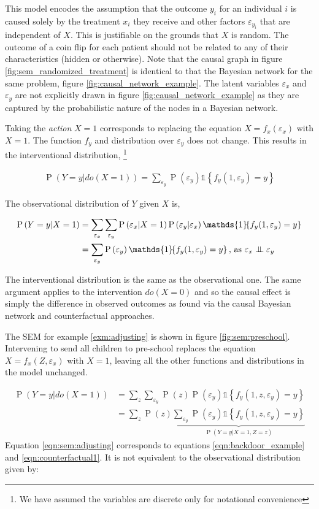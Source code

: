 \documentclass[11pt,a4paper,oneside]{book}
\newcommand{\set}[1]{\left\{#1\right\}}
\newcommand{\ind}[1]{\mathds{1}\!\!\set{#1}}
\newcommand{\eqn}[1]{\begin{align}#1\end{align}}
\renewcommand{\P}[1]{\operatorname{P}\left(#1\right)}
\theoremstyle{plain}
\theoremstyle{definition}
\let\epsilon\varepsilon
\newcommand{\ci}{\mathrel{\perp\mspace{-10mu}\perp}}
\begin{document}
This model encodes the assumption that the outcome $y_{i}$ for an individual $i$ is caused solely by the treatment $x_{i}$ they receive and other factors $\epsilon_{y_{i}}$ that are independent of $X$. This is justifiable on the grounds that $X$ is random. The outcome of a coin flip for each patient should not be related to any of their characteristics (hidden or otherwise). Note that the causal graph in figure \ref{fig:sem_randomized_treatment} is identical to that the Bayesian network for the same problem, figure \ref{fig:causal_network_example}. The latent variables $\epsilon_x$ and $\epsilon_y$ are not explicitly drawn in figure \ref{fig:causal_network_example} as they are captured by the probabilistic nature of the nodes in a Bayesian network.

Taking the \emph{action} $X=1$ corresponds to replacing the equation $X=f_x(\epsilon_x)$ with $X=1$. The function $f_y$ and distribution over $\epsilon_y$ does not change. This results in the interventional distribution, \footnote{We have assumed the variables are discrete only for notational convenience}

\eqn {
\P{Y=y|do(X=1)} = \sum_{\epsilon_y}\P{\epsilon_y}\ind{f_y(1,\epsilon_y)=y}
}

The observational distribution of $Y$ given $X$ is,

\eqn{
\P{Y=y|X=1} &= \sum_{\epsilon_x}\sum_{\epsilon_y}\P{\epsilon_x|X=1}\P{\epsilon_y|\epsilon_x}\ind{f_y(1,\epsilon_y)=y} \\
& = \sum_{\epsilon_y}\P{\epsilon_y}\ind{f_y(1,\epsilon_y)=y} \text{, as } \epsilon_x \ci \epsilon_y
}

The interventional distribution is the same as the observational one. The same argument applies to the intervention $do(X=0)$ and so the causal effect is simply the difference in observed outcomes as found via the causal Bayesian network and counterfactual approaches. 

The SEM for example \ref{exm:adjusting} is shown in figure \ref{fig:sem:preschool}. Intervening to send all children to pre-school replaces the equation $X = f_x(Z,\epsilon_x)$ with $X=1$, leaving all the other functions and distributions in the model unchanged. 

\eqn{
\P{Y=y|do(X=1)} &= \sum_{z}\sum_{\epsilon_y}\P{z}\P{\epsilon_y}\ind{f_y(1,z,\epsilon_y)=y} \\
\label{eqn:sem:adjusting}
&=\sum_{z}\P{z}\underbrace{\sum_{\epsilon_y}\P{\epsilon_y}\ind{f_y(1,z,\epsilon_y)=y}}_{\P{Y=y|X=1,Z=z}}
}
Equation \ref{eqn:sem:adjusting} corresponds to equations \ref{eqn:backdoor_example} and \ref{eqn:counterfactual1}. It is not equivalent to the observational distribution given by:
\end{document}
